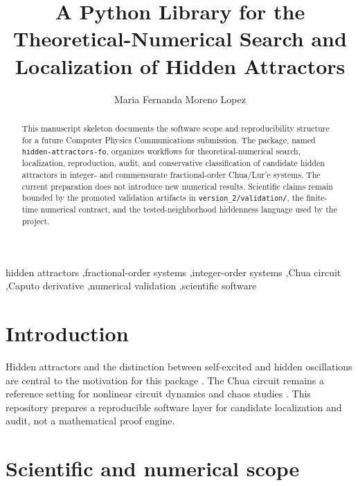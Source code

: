 \documentclass[preprint,12pt]{elsarticle}
\begin{document}
\begin{frontmatter}

\title{A Python Library for the Theoretical-Numerical Search and Localization of Hidden Attractors}

\author[inaoe]{Maria Fernanda Moreno Lopez}

\begin{abstract}
This manuscript skeleton documents the software scope and reproducibility structure for a future Computer Physics Communications submission. The package, named \texttt{hidden-attractors-fo}, organizes workflows for theoretical-numerical search, localization, reproduction, audit, and conservative classification of candidate hidden attractors in integer- and commensurate fractional-order Chua/Lur'e systems. The current preparation does not introduce new numerical results. Scientific claims remain bounded by the promoted validation artifacts in \texttt{version\_2/validation/}, the finite-time numerical contract, and the tested-neighborhood hiddenness language used by the project.
\end{abstract}

\begin{keyword}
hidden attractors \sep fractional-order systems \sep integer-order systems \sep Chua circuit \sep Caputo derivative \sep numerical validation \sep scientific software
\end{keyword}

\end{frontmatter}



\section{Introduction}

Hidden attractors and the distinction between self-excited and hidden oscillations are central to the motivation for this package \cite{leonov_kuznetsov_hidden_2013,kuznetsov_hidden_attractors_2017}. The Chua circuit remains a reference setting for nonlinear circuit dynamics and chaos studies \cite{matsumoto_chua_1984}. This repository prepares a reproducible software layer for candidate localization and audit, not a mathematical proof engine.

\section{Scientific and numerical scope}
\end{document}
